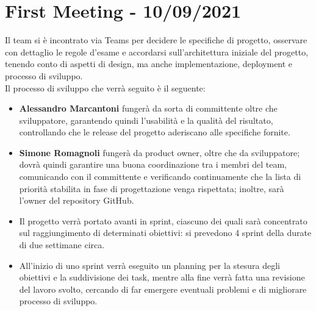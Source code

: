 \section*{First Meeting - 10/09/2021}
Il team si è incontrato via Teams per decidere le specifiche di progetto, osservare con dettaglio le regole d'esame e
accordarsi sull'architettura iniziale del progetto, tenendo conto di aspetti di design, ma anche implementazione,
deployment e processo di sviluppo.\\
Il processo di sviluppo che verrà seguito è il seguente:
\begin{itemize}
    \item \textbf{Alessandro Marcantoni} fungerà da sorta di committente oltre che sviluppatore, garantendo quindi l'usabilità e la qualità del risultato, controllando che le release del progetto aderiscano alle specifiche fornite.
    \item \textbf{Simone Romagnoli} fungerà da product owner, oltre che da sviluppatore; dovrà quindi garantire una buona coordinazione tra i membri del team, comunicando con il committente e verificando continuamente che la lista di priorità stabilita in fase di progettazione venga rispettata; inoltre, sarà l'owner del repository GitHub.
    \item Il progetto verrà portato avanti in sprint, ciascuno dei quali sarà concentrato sul raggiungimento di determinati obiettivi: si prevedono 4 sprint della durate di due settimane circa.
    \item All'inizio di uno sprint verrà eseguito un planning per la stesura degli obiettivi e la suddivisione dei task, mentre alla fine verrà fatta una revisione del lavoro svolto, cercando di far emergere eventuali problemi e di migliorare processo di sviluppo.
\end{itemize}